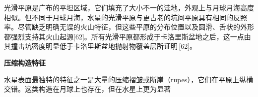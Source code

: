 光滑平原是广布的平坦区域，它们填充了大小不一的洼地，外观上与月球月海高度相似。但不同于月球月海，水星的光滑平原与更古老的坑间平原具有相同的反照率。尽管缺乏明确无误的火山特征，但这些平原的分布位置以及圆滑、舌状的外形都强烈支持其火山起源[62]。所有光滑平原都形成于卡洛里斯盆地之后，这一点由其撞击坑密度明显低于卡洛里斯盆地抛射物覆盖层所证明\,[62]。

\textbf{压缩构造特征}

水星表面最独特的特征之一是大量的压缩褶皱或断崖（rupes），它们在平原上纵横交错。这类构造在月球上也存在，但在水星上更为显著
































































































